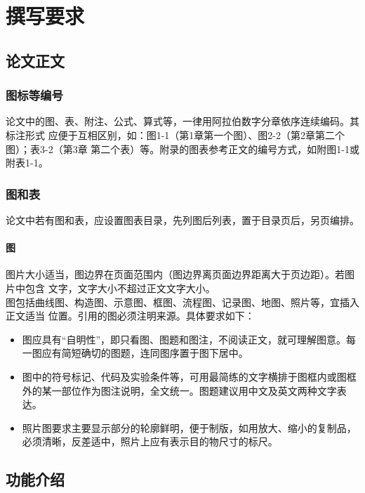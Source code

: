 \chapter{撰写要求}

\section{论文正文}
\subsection{图标等编号}

论文中的图、表、附注、公式、算式等，一律用阿拉伯数字分章依序连续编码。其标注形式
应便于互相区别，如：图1-1（第1章第一个图）、图2-2（第2章第二个图）；表3-2（第3章
第二个表）等。附录的图表参考正文的编号方式，如附图1-1或附表1-1。

\subsection{图和表}

论文中若有图和表，应设置图表目录，先列图后列表，置于目录页后，另页编排。

\subsubsection{图}

图片大小适当，图边界在页面范围内（图边界离页面边界距离大于页边距）。若图片中包含
文字，文字大小不超过正文文字大小。\\
图包括曲线图、构造图、示意图、框图、流程图、记录图、地图、照片等，宜插入正文适当
位置。引用的图必须注明来源。具体要求如下：
\begin{itemize}
    \item 图应具有“自明性”，即只看图、图题和图注，不阅读正文，就可理解图意。每一图应有简短确切的图题，连同图序置于图下居中。
    \item 图中的符号标记、代码及实验条件等，可用最简练的文字横排于图框内或图框外的某一部位作为图注说明，全文统一。图题建议用中文及英文两种文字表达。
    \item 照片图要求主要显示部分的轮廓鲜明，便于制版，如用放大、缩小的复制品，必须清晰，反差适中，照片上应有表示目的物尺寸的标尺。
\end{itemize}

\section{功能介绍}

